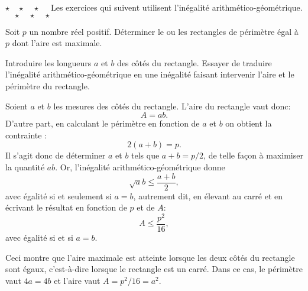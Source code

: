 
\begin{center}
$\star\quad\star\quad\star\quad$ 
Les exercices qui suivent utilisent l'inégalité arithmético-géométrique. $\quad\star\quad\star\quad\star$
\end{center}

\begin{exo} Soit $p$ un nombre réel positif. Déterminer le ou les rectangles de périmètre égal à $p$ dont l'aire est maximale.

\begin{hint}
Introduire les longueurs $a$ et $b$ des côtés du rectangle. Essayer de traduire l'inégalité arithmético-géométrique en une inégalité faisant intervenir l'aire et le périmètre du rectangle.
\end{hint}

\begin{sol}
Soient $a$ et $b$ les mesures des côtés du rectangle. L'aire du rectangle vaut donc: 
\[ A=ab.\]
 D'autre part, en  calculant le périmètre en fonction de $a$ et $b$ on obtient la contrainte :
\[ 2(a+b)=p.\]
Il s'agit donc de déterminer $a$ et $b$ tels que $a+b=p/2$, de telle façon à maximiser la quantité $ab$. Or, l'inégalité arithmético-géométrique donne
\[ \sqrt ab \leq \frac{a+b}{2}, \]
avec égalité si et seulement si $a=b$, autrement dit, en élevant au carré et en écrivant le résultat en fonction de $p$ et de $A$:
\[ A \leq \frac{p^2}{16},\]
avec égalité si et si $a=b$.

Ceci montre que l'aire maximale est atteinte lorsque les deux côtés du rectangle sont égaux, c'est-à-dire lorsque le rectangle est un carré. Dans ce cas, le périmètre vaut $4a=4b$ et l'aire vaut $A=p^2/16 = a^2$.
\end{sol}
\end{exo}

